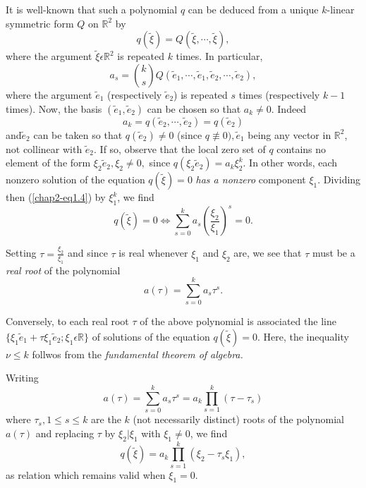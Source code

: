 It is well-known that such a polynomial $q$ can be deduced from a unique $k$-linear symmetric form $Q$ on $\mathbb{R}^{2}$ by
$$
q(\widetilde{\xi}) = Q(\widetilde{\xi}, \cdots , \widetilde{\xi}),
$$
where the argument $\widetilde{\xi} \epsilon \mathbb{R}^{2}$ is repeated $k$ times. In particular,
$$
a_{s} = \binom{k}{s} Q (\widetilde{e}_{1}, \cdots, \widetilde{e}_{1}, \widetilde{e}_{2}, \cdots , \widetilde{e}_{2}),
$$
where the argument $\widetilde{e}_{1}$ (respectively $\widetilde{e}_{2}$) is repeated $s$ times (respectively $k-1$ times). Now, the basis $(\widetilde{e}_{1}, \widetilde{e}_{2})$ can be chosen so that $a_{k} \neq 0$. Indeed
$$
a_{k} = q (\widetilde{e}_{2}, \cdots, \widetilde{e}_{2}) = q(\widetilde{e}_{2})
$$
and\pageoriginale $\widetilde{e}_{2}$ can be taken so that $q(\widetilde{e}_{2}) \neq 0$ (since $q \nequiv 0), \widetilde{e}_{1}$ being any vector in $\mathbb{R}^{2}$, not collinear with $\widetilde{e}_{2}$. If so, observe that the local zero set of $q$ contains no element of the form $\xi_{2} \widetilde{e}_{2}, \xi_{2} \neq 0,$ since $q(\xi_{2} \widetilde{e}_{2}) = a_{k} \xi_{2}^{k}$. In other words, each nonzero solution of the equation $q(\widetilde{\xi}) = 0$ {\em has a nonzero} component $\xi_{1}$. Dividing then (\ref{chap2-eq1.4}) by $\xi_{1}^{k}$, we find
$$
q(\widetilde{\xi}) = 0 \Leftrightarrow \sum\limits_{s=0}^{k} a_{s} \left(\frac{\xi_{2}}{\xi_{1}}\right)^s = 0.
$$

Setting $\tau = \frac{\xi_{2}}{\xi_{1}}$ and since $\tau$ is real whenever $\xi_{1}$ and $\xi_{2}$ are, we see that $\tau$ must be a {\em real root} of the polynomial
$$
a(\tau) = \sum\limits_{s=0}^{k} a_{s} \tau^{s}.
$$

Conversely, to each real root $\tau$ of the above polynomial is associated the line $\{\xi_{1} \widetilde{e}_{1} + \tau \xi_{1} \widetilde{e}_{2} ; \xi_{1} \epsilon \mathbb{R} \}$ of solutions of the equation $q(\widetilde{\xi}) = 0$. Here, the inequality $\nu \leq k$ follwos from the {\em fundamental theorem of algebra.}

\begin{remark}\label{chap2-rem1.1}
Writing
$$
a(\tau) = \sum\limits_{s=0}^{k} a_{s} \tau^{s} = a_{k} \prod_{s=1}^{k} (\tau - \tau_{s})
$$
where $\tau_{s}, 1 \leq s \leq k$ are the $k$ (not necessarily distinct) roots of the polynomial $a(\tau)$ and replacing $\tau$ by $\xi_{2} | \xi_{1}$ with $\xi_{1} \neq 0$, we find
$$
q(\widetilde{\xi}) = a_{k} \prod_{s=1}^{k} (\xi_{2} - \tau_{s} \xi_{1}),
$$
as relation which remains valid when $\xi_{1} = 0$.
\end{remark}

